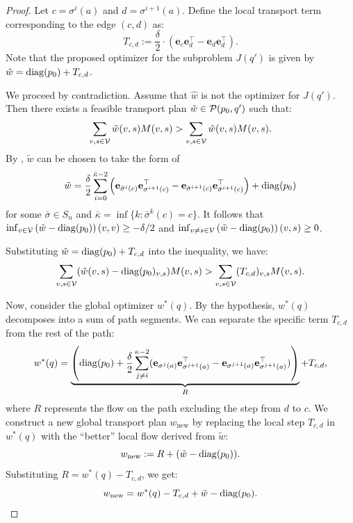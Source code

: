 \begin{proof}
Let $c = \sigma^i(a)$ and $d = \sigma^{i+1}(a)$. Define the local transport term corresponding to the edge $(c, d)$ as:
$$ T_{c,d} := \frac{\delta}{2} \cdot (\mathbf{e}_c \mathbf{e}_d^\top - \mathbf{e}_d \mathbf{e}_d^\top). $$
Note that the proposed optimizer for the subproblem $J(q')$ is given by $\hat{w} = \mathrm{diag}(p_0) + T_{c,d}$. 

We proceed by contradiction. Assume that $\hat{w}$ is not the optimizer for $J(q')$. Then there exists a feasible transport plan $\tilde{w} \in \mathcal{P}(p_0, q')$ such that:
$$ \sum_{v,s \in \mathcal{V}} \tilde{w}(v,s) M(v,s) > \sum_{v,s \in \mathcal{V}} \hat{w}(v,s) M(v,s). $$
By , $\tilde{w}$ can be chosen to take the form of
\begin{align*}
    \tilde{w} = \frac{\delta}{2} \sum_{i=0}^{\bar \kappa-2} 
        \left(\mathbf{e}_{\bar \sigma^{i}(c)}\mathbf{e}_{\sigma^{i+1}(c)}^\top 
              - \mathbf{e}_{\bar \sigma^{i+1}(c)}\mathbf{e}_{\bar \sigma^{i+1}(c)}^\top\right) 
      + \mathrm{diag}(p_0)
\end{align*}
for some $\bar \sigma \in S_n$ and $\bar \kappa = \inf\{k:\bar \sigma^k(c) = c\}$.
It follows that $\inf_{v \in \mathcal{V}}\left(\tilde{w} - \mathrm{diag}(p_0)\right)(v,v) \geq -\delta/2$ and $\inf_{v \neq s \in \mathcal{V}}\left(\tilde{w} - \mathrm{diag}(p_0)\right)(v,s) \geq 0$.

Substituting $\hat{w} = \mathrm{diag}(p_0) + T_{c,d}$ into the inequality, we have:
\begin{equation} \label{eq:contra_ineq}
\sum_{v,s \in \mathcal{V}} (\tilde{w}(v,s) - \mathrm{diag}(p_0)_{v,s}) M(v,s) > \sum_{v,s \in \mathcal{V}} (T_{c,d})_{v,s} M(v,s).
\end{equation}

Now, consider the global optimizer $w^*(q)$. By the hypothesis, $w^*(q)$ decomposes into a sum of path segments. We can separate the specific term $T_{c,d}$ from the rest of the path:
$$ w^*(q) = \underbrace{\left( \mathrm{diag}(p_0) + \frac{\delta}{2} \sum_{j \neq i}^{\kappa-2} (\mathbf{e}_{\sigma^{j}(a)}\mathbf{e}_{\sigma^{j+1}(a)}^\top - \mathbf{e}_{\sigma^{j+1}(a)}\mathbf{e}_{\sigma^{j+1}(a)}^\top) \right)}_{R} + T_{c,d}, $$
where $R$ represents the flow on the path excluding the step from $d$ to $c$. We construct a new global transport plan $w_{\text{new}}$ by replacing the local step $T_{c,d}$ in $w^*(q)$ with the ``better'' local flow derived from $\tilde{w}$:
$$ w_{\text{new}} := R + (\tilde{w} - \mathrm{diag}(p_0)). $$
Substituting $R = w^*(q) - T_{c,d}$, we get:
$$ w_{\text{new}} = w^*(q) - T_{c,d} + \tilde{w} - \mathrm{diag}(p_0). $$


\end{proof}
